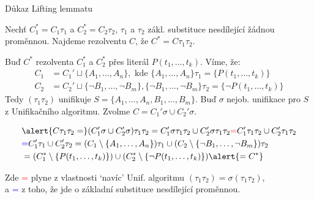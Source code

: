 \documentclass{beamer}
\begin{document}
\begin{frame}{Důkaz Lifting lemmatu}

    \pause
    Nechť \alert{$C^*_1=C_1\tau_1$} a \alert{$C^*_2=C_2\tau_2$}, $\tau_1$ a $\tau_2$ zákl. substituce nesdílející žádnou proměnnou. Najdeme rezolventu $C$, že \alert{$C^*=C\tau_1\tau_2$}.

    \pause
    Buď $C^*$ rezolventa $C_1^*$ a $C_2^*$ přes literál $P(t_1,\dots,t_k)$. Víme, že:\pause
    \begin{align*}
        C_1&=C_1' \sqcup \{A_1,\dots,A_n\},\text{ kde }\{A_1,\dots,A_n\}\tau_1=\{P(t_1,\dots,t_k)\}\\
        C_2&=C_2' \sqcup \{\neg B_1,\dots,\neg B_m\},\{\neg B_1,\dots,\neg B_m\}\tau_2=\{\neg P(t_1,\dots,t_k)\}
    \end{align*}
    \pause Tedy $(\tau_1\tau_2)$ unifikuje $S=\{A_1,\dots,A_n,B_1,\dots,B_m\}$. Buď $\sigma$ nejob. unifikace pro $S$ z Unifikačního algoritmu. Zvolme \alert{$C=C_1'\sigma \cup C_2'\sigma$}.

    \vspace{-24pt}
    
    \pause
    \begin{align*}
        &\alert{C\tau_1\tau_2
        =} (C_1'\sigma \cup C_2'\sigma)\tau_1\tau_2
        =C_1'\sigma\tau_1\tau_2 \cup C_2'\sigma\tau_1\tau_2
        \textcolor{red}{=}C_1'\tau_1\tau_2 \cup C_2'\tau_1\tau_2\\ &
        \textcolor{blue}{=}C_1'\tau_1 \cup C_2'\tau_2
        =(C_1\setminus\{A_1,\dots,A_n\})\tau_1\cup (C_2\setminus\{\neg B_1,\dots,\neg B_m\})\tau_2\\
        &=(C_1^*\setminus\{P(t_1,\dots,t_k)\})\cup(C_2^*\setminus \{\neg P(t_1,\dots,t_k)\})\alert{=C^*}
    \end{align*}
    
    \pause
    Zde \textcolor{red}{=} plyne z vlastnosti `navíc' Unif. algoritmu $(\tau_1\tau_2)=\sigma(\tau_1\tau_2)$, \\a \textcolor{blue}{=} z 
    toho, že jde o základní substituce nesdílející proměnnou.\hfill\qedsymbol    

\end{frame}
\end{document}
